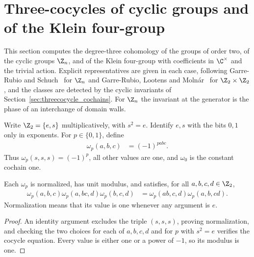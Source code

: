\section{Three-cocycles of cyclic groups and of the Klein four-group}
\label{sec:threecocycle_examples}

This section computes the degree-three cohomology of the groups of order two,
of the cyclic groups $\Z_n$, and of the Klein four-group with coefficients in
$\C^\times$ and the trivial action. Explicit representatives are given in each
case, following Garre-Rubio and Schuch~\cite{GarreRubioSchuch2024DomainWall}
for $\Z_n$ and Garre-Rubio, Lootens and Moln\'ar~\cite{GarreRubio2023MPOSym}
for $\Z_2\times\Z_2$, and the classes are detected by the cyclic invariants of
Section~\ref{sec:threecocycle_cochains}. For $\Z_n$ the invariant at the
generator is the phase of an interchange of domain walls.

\begin{definition}
    \label{def:asymex_z2_cocycles}
    \leanok
    Write $\Z_2=\{e,s\}$ multiplicatively, with $s^2=e$.
    Identify $e,s$ with the bits $0,1$ only in exponents.
    For $p\in\{0,1\}$, define
    \begin{align}
        \omega_p(a,b,c) & =(-1)^{pabc}.
    \end{align}
    Thus $\omega_p(s,s,s)=(-1)^p$, all other values are one,
    and $\omega_0$ is the constant cochain one.
\end{definition}

\begin{lemma}
    \label{thm:asymex_z2_properties}
    \leanok
    Each $\omega_p$ is normalized, has unit modulus, and satisfies,
    for all $a,b,c,d\in\Z_2$,
    \begin{align}
        \omega_p(a,b,c)\omega_p(a,bc,d)\omega_p(b,c,d)
         & =\omega_p(ab,c,d)\omega_p(a,b,cd).
    \end{align}
    Normalization means that its value is one whenever any argument is $e$.
\end{lemma}
\begin{proof}
    \leanok
    An identity argument excludes the triple $(s,s,s)$, proving
    normalization, and checking the two choices for each of $a,b,c,d$
    and for $p$ with $s^2=e$ verifies the cocycle equation.
    Every value is either one or a power of $-1$, so its modulus is one.
\end{proof}

